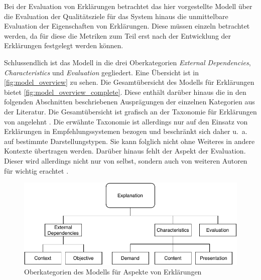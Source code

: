 Bei der Evaluation von Erklärungen betrachtet das hier vorgestellte Modell über die Evaluation der Qualitätsziele für das System hinaus \cite[vgl.][]{schneider2012abenteuer} die unmittelbare Evaluation der Eigenschaften von Erklärungen. Diese müssen einzeln betrachtet werden, da für diese die Metriken zum Teil erst nach der Entwicklung der Erklärungen festgelegt werden können.

\smallbreak

Schlussendlich ist das Modell in die drei Oberkategorien \textit{External Dependencies}, \textit{Characteristics} und \textit{Evaluation} gegliedert. Eine Übersicht ist in \autoref{fig:model_overview} zu sehen. Die Gesamtübersicht des Modells für Erklärungen bietet \autoref{fig:model_overview_complete}. Diese enthält darüber hinaus die in den folgenden Abschnitten beschriebenen Ausprägungen der einzelnen Kategorien aus der Literatur. Die Gesamtübersicht ist grafisch an der Taxonomie für Erklärungen von \citeauthor{nunes_systematic_2017} angelehnt \cite{nunes_systematic_2017}. Die erwähnte Taxonomie ist allerdings nur auf den Einsatz von Erklärungen in Empfehlungssystemen bezogen und beschränkt sich daher u.~a. auf bestimmte Darstellungstypen. Sie kann folglich nicht ohne Weiteres in andere Kontexte übertragen werden. Darüber hinaus fehlt der Aspekt der Evaluation. Dieser wird allerdings nicht nur von \citeauthor{nunes_systematic_2017} selbst, sondern auch von weiteren Autoren für wichtig erachtet \cite{cirqueira_scenario-based_2020, martin_evaluating_2021,nunes_systematic_2017}.

\begin{figure}[htb!]
    \begin{center}
        \includegraphics[width=0.9\linewidth]{contents/05_model_description/res/model-overview.pdf}
    \end{center}
    \caption{Oberkategorien des Modells für Aspekte von Erklärungen}
    \label{fig:model_overview}
\end{figure}